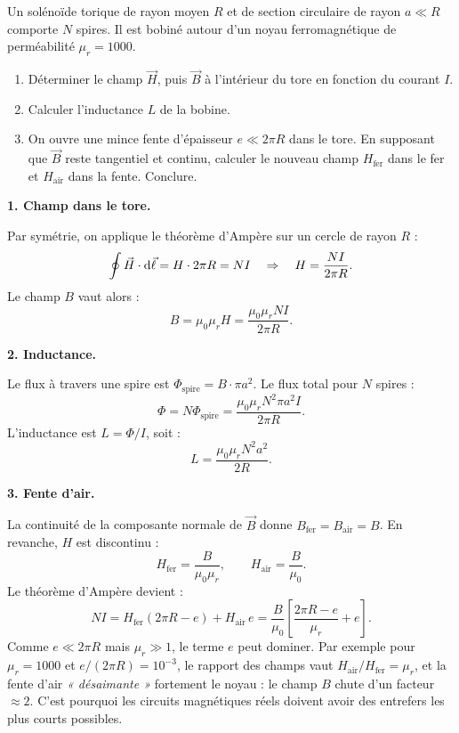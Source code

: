 \documentclass[12pt,a4paper]{article}
\begin{document}
\begin{boiteexercice}
Un solénoïde torique de rayon moyen $R$ et de section circulaire de rayon $a\ll R$ comporte $N$ spires. Il est bobiné autour d'un noyau ferromagnétique de perméabilité $\mu_r = 1000$.
\begin{enumerate}
  \item Déterminer le champ $\vec{H}$, puis $\vec{B}$ à l'intérieur du tore en fonction du courant $I$.
  \item Calculer l'inductance $L$ de la bobine.
  \item On ouvre une mince fente d'épaisseur $e\ll 2\pi R$ dans le tore. En supposant que $\vec{B}$ reste tangentiel et continu, calculer le nouveau champ $H_\text{fer}$ dans le fer et $H_\text{air}$ dans la fente. Conclure.
\end{enumerate}
\end{boiteexercice}

\begin{boitecorrige}

\textbf{1. Champ dans le tore.}

Par symétrie, on applique le théorème d'Ampère sur un cercle de rayon $R$ :
\[
\oint \vec{H}\cdot\mathrm{d}\vec{\ell} = H\cdot 2\pi R = NI \quad\Rightarrow\quad H = \frac{NI}{2\pi R}.
\]
Le champ $B$ vaut alors :
\[
B = \mu_0\mu_r H = \frac{\mu_0\mu_r N I}{2\pi R}.
\]

\textbf{2. Inductance.}

Le flux à travers une spire est $\Phi_\text{spire} = B\cdot\pi a^2$. Le flux total pour $N$ spires :
\[
\Phi = N\Phi_\text{spire} = \frac{\mu_0\mu_r N^2 \pi a^2 I}{2\pi R}.
\]
L'inductance est $L = \Phi/I$, soit :
\[
L = \frac{\mu_0\mu_r N^2 a^2}{2R}.
\]

\textbf{3. Fente d'air.}

La continuité de la composante normale de $\vec{B}$ donne $B_\text{fer} = B_\text{air} = B$. En revanche, $H$ est discontinu :
\[
H_\text{fer} = \frac{B}{\mu_0\mu_r}, \qquad H_\text{air} = \frac{B}{\mu_0}.
\]
Le théorème d'Ampère devient :
\[
NI = H_\text{fer}(2\pi R - e) + H_\text{air}\,e = \frac{B}{\mu_0}\!\left[\frac{2\pi R - e}{\mu_r} + e\right].
\]
Comme $e\ll 2\pi R$ mais $\mu_r\gg 1$, le terme $e$ peut dominer. Par exemple pour $\mu_r = 1000$ et $e/(2\pi R) = 10^{-3}$, le rapport des champs vaut $H_\text{air}/H_\text{fer} = \mu_r$, et la fente d'air \emph{« désaimante »} fortement le noyau : le champ $B$ chute d'un facteur $\approx 2$. C'est pourquoi les circuits magnétiques réels doivent avoir des entrefers les plus courts possibles.

\end{boitecorrige}
\end{document}

